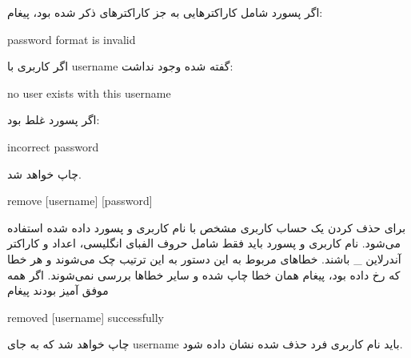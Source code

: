 \documentclass[]{article}
\begin{document}
اگر پسورد شامل کاراکترهایی به جز کاراکترهای ذکر شده بود، پیغام:



\begin{tcolorbox}[boxrule=0pt]
	\begin{latin}
  	  \large{
  	  	password format is invalid
		}
	\end{latin}
\end{tcolorbox}

اگر کاربری با username گفته شده وجود نداشت:



\begin{tcolorbox}[boxrule=0pt]
	\begin{latin}
  	  \large{
  	  	no user exists with this username
		}
	\end{latin}
\end{tcolorbox}

اگر پسورد غلط بود:


\begin{tcolorbox}[boxrule=0pt]
	\begin{latin}
  	  \large{
  	  	incorrect password
		}
	\end{latin}
\end{tcolorbox}

چاپ خواهد شد.

\hrulefill




\begin{tcolorbox}[boxrule=0pt]
	\begin{latin}
  	  \large{
  	  	remove [username] [password]
		}
	\end{latin}
\end{tcolorbox}

برای حذف کردن یک حساب کاربری مشخص با نام کاربری و پسورد داده شده استفاده می‌شود. نام کاربری و پسورد باید فقط شامل حروف الفبای انگلیسی، اعداد و کاراکتر آندرلاین \_ باشند. خطاهای مربوط به این دستور به این ترتیب چک می‌شوند و هر خطا که رخ داده بود، پیغام همان خطا چاپ شده و سایر خطاها بررسی نمی‌شوند. اگر همه موفق آمیز بودند پیغام


\begin{tcolorbox}[boxrule=0pt]
	\begin{latin}
  	  \large{
  	  	removed [username] successfully
		}
	\end{latin}
\end{tcolorbox}

چاپ خواهد شد که به جای username باید نام کاربری فرد حذف شده نشان داده شود.
\end{document}
